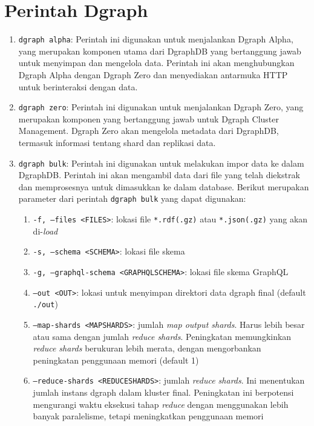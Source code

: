 \chapter{Perintah Dgraph}
\label{appendix:dgraph-commands}

\begin{enumerate}
	\item \texttt{dgraph alpha}: Perintah ini digunakan untuk menjalankan Dgraph Alpha, yang merupakan komponen utama dari DgraphDB yang bertanggung jawab untuk menyimpan dan mengelola data. Perintah ini akan menghubungkan Dgraph Alpha dengan Dgraph Zero dan menyediakan antarmuka HTTP untuk berinteraksi dengan data.
	\item \texttt{dgraph zero}: Perintah ini digunakan untuk menjalankan Dgraph Zero, yang merupakan komponen yang bertanggung jawab untuk Dgraph Cluster Management. Dgraph Zero akan mengelola metadata dari DgraphDB, termasuk informasi tentang shard dan replikasi data.
	\item \texttt{dgraph bulk}: Perintah ini digunakan untuk melakukan impor data ke dalam DgraphDB. Perintah ini akan mengambil data dari file yang telah diekstrak dan memprosesnya untuk dimasukkan ke dalam database. Berikut merupakan parameter dari perintah \texttt{dgraph bulk} yang dapat digunakan:
	      \begin{enumerate}
		      \item \texttt{-f, --files <FILES>}: lokasi file \texttt{*.rdf(.gz)} atau \texttt{*.json(.gz)} yang akan di-\textit{load}
		      \item \texttt{-s, --schema <SCHEMA>}: lokasi file skema
		      \item \texttt{-g, --graphql-schema <GRAPHQL\textunderscore SCHEMA>}: lokasi file skema GraphQL
		      \item \texttt{--out <OUT>}: lokasi untuk menyimpan direktori data dgraph final (default \texttt{./out})
		      \item \texttt{--map-shards <MAP\textunderscore SHARDS>}: jumlah \textit{map output shards}. Harus lebih besar atau sama dengan jumlah \textit{reduce shards}. Peningkatan memungkinkan \textit{reduce shards} berukuran lebih merata, dengan mengorbankan peningkatan penggunaan memori (default 1)
		      \item \texttt{--reduce-shards <REDUCE\textunderscore SHARDS>}: jumlah \textit{reduce shards}. Ini menentukan jumlah instans dgraph dalam kluster final. Peningkatan ini berpotensi mengurangi waktu eksekusi tahap \textit{reduce} dengan menggunakan lebih banyak paralelisme, tetapi meningkatkan penggunaan memori

\end{enumerate}
\end{enumerate}

